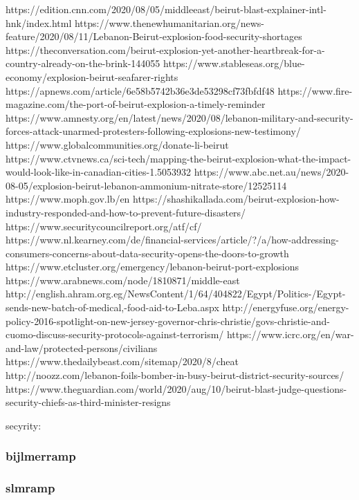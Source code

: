 https://edition.cnn.com/2020/08/05/middleeast/beirut-blast-explainer-intl-hnk/index.html
https://www.thenewhumanitarian.org/news-feature/2020/08/11/Lebanon-Beirut-explosion-food-security-shortages
https://theconversation.com/beirut-explosion-yet-another-heartbreak-for-a-country-already-on-the-brink-144055
https://www.stableseas.org/blue-economy/explosion-beirut-seafarer-rights
https://apnews.com/article/6e58b5742b36e3de53298cf73fbfdf48
https://www.fire-magazine.com/the-port-of-beirut-explosion-a-timely-reminder
https://www.amnesty.org/en/latest/news/2020/08/lebanon-military-and-security-forces-attack-unarmed-protesters-following-explosions-new-testimony/
https://www.globalcommunities.org/donate-li-beirut
https://www.ctvnews.ca/sci-tech/mapping-the-beirut-explosion-what-the-impact-would-look-like-in-canadian-cities-1.5053932
https://www.abc.net.au/news/2020-08-05/explosion-beirut-lebanon-ammonium-nitrate-store/12525114
https://www.moph.gov.lb/en
https://shashikallada.com/beirut-explosion-how-industry-responded-and-how-to-prevent-future-disasters/
https://www.securitycouncilreport.org/atf/cf/%
https://www.nl.kearney.com/de/financial-services/article/?/a/how-addressing-consumers-concerns-about-data-security-opens-the-doors-to-growth
https://www.etcluster.org/emergency/lebanon-beirut-port-explosions
https://www.arabnews.com/node/1810871/middle-east
http://english.ahram.org.eg/NewsContent/1/64/404822/Egypt/Politics-/Egypt-sends-new-batch-of-medical,-food-aid-to-Leba.aspx
http://energyfuse.org/energy-policy-2016-spotlight-on-new-jersey-governor-chris-christie/govs-christie-and-cuomo-discuss-security-protocols-against-terrorism/
https://www.icrc.org/en/war-and-law/protected-persons/civilians
https://www.thedailybeast.com/sitemap/2020/8/cheat
http://noozz.com/lebanon-foils-bomber-in-busy-beirut-district-security-sources/
https://www.theguardian.com/world/2020/aug/10/beirut-blast-judge-questions-security-chiefs-as-third-minister-resigns


secyrity:







\subsubsection{bijlmerramp}



\subsubsection{slmramp}

